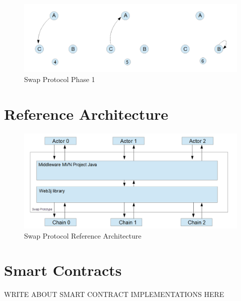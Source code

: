 \begin{figure}[h]
	\includegraphics[width=0.7\paperwidth]{phase1}
	\caption{Swap Protocol Phase 1}
	\label{fig:phase1}
\end{figure}

\clearpage


\section{Reference Architecture}
\label{sec:chapter04:ref_architecture}


\begin{figure}[h]
	\includegraphics[width=0.7\paperwidth]{reference_architecture}	%
	\caption{Swap Protocol Reference Architecture}
	\label{fig:reference_architecture}
\end{figure}
\clearpage

%
%
\section{Smart Contracts}
\label{sec:chapter04:smartcontracts}
WRITE ABOUT SMART CONTRACT IMPLEMENTATIONS HERE

